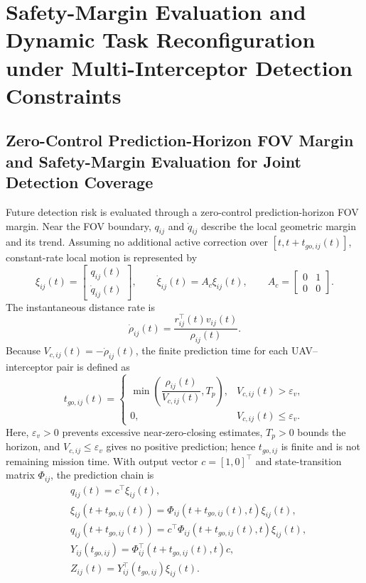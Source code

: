 \documentclass[unbranded]{cja}
\begin{document}
\section{Safety-Margin Evaluation and Dynamic Task Reconfiguration under Multi-Interceptor Detection Constraints}

\subsection{Zero-Control Prediction-Horizon FOV Margin and Safety-Margin Evaluation for Joint Detection Coverage}

Future detection risk is evaluated through a zero-control prediction-horizon FOV margin. Near the FOV boundary, $q_{ij}$ and $\dot q_{ij}$ describe the local geometric margin and its trend. Assuming no additional active correction over $[t,t+t_{go,ij}(t)]$, constant-rate local motion is represented by
\begin{equation}
\xi_{ij}(t)=
\begin{bmatrix}
q_{ij}(t)\\
\dot q_{ij}(t)
\end{bmatrix},
\qquad
\dot \xi_{ij}(t)=A_c\xi_{ij}(t),
\qquad
A_c=
\begin{bmatrix}
0&1\\
0&0
\end{bmatrix}.
\end{equation}
The instantaneous distance rate is
\begin{equation}
\dot\rho_{ij}(t)
=
\frac{r_{ij}^{\top}(t)v_{ij}(t)}{\rho_{ij}(t)}.
\end{equation}
Because $V_{c,ij}(t)=-\dot\rho_{ij}(t)$, the finite prediction time for each UAV--interceptor pair is defined as
\begin{equation}
t_{go,ij}(t)
=
\begin{cases}
\displaystyle
\min\!\left(
\dfrac{\rho_{ij}(t)}{V_{c,ij}(t)},
T_p
\right),
& V_{c,ij}(t)>\varepsilon_v,\\[3mm]
0,
& V_{c,ij}(t)\le\varepsilon_v.
\end{cases}
\end{equation}
Here, $\varepsilon_v>0$ prevents excessive near-zero-closing estimates, $T_p>0$ bounds the horizon, and $V_{c,ij}\le\varepsilon_v$ gives no positive prediction; hence $t_{go,ij}$ is finite and is not remaining mission time. With output vector $c=[1,0]^\top$ and state-transition matrix $\Phi_{ij}$, the prediction chain is
\begin{equation}
\begin{aligned}
&q_{ij}(t)=c^\top\xi_{ij}(t),\\
&\xi_{ij}\!\left(t+t_{go,ij}(t)\right)
=\Phi_{ij}\!\left(t+t_{go,ij}(t),t\right)\xi_{ij}(t),\\
&q_{ij}\!\left(t+t_{go,ij}(t)\right)
=c^\top\Phi_{ij}\!\left(t+t_{go,ij}(t),t\right)\xi_{ij}(t),\\
&Y_{ij}(t_{go,ij})
=\Phi_{ij}^{\top}\!\left(t+t_{go,ij}(t),t\right)c,\\
&Z_{ij}(t)=Y_{ij}^{\top}(t_{go,ij})\xi_{ij}(t).
\end{aligned}
\end{equation}
\end{document}
